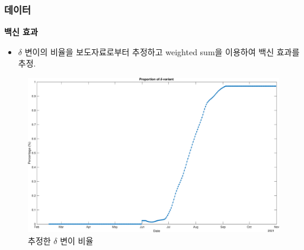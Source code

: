 \documentclass[aspectratio=169, 9pt, xcolor=dvipsnames]{beamer}
\begin{document}
		\begin{frame}\frametitle{데이터}
	    \textbf{백신 효과} \\
		\begin{itemize}
			\item $\delta$ 변이의 비율을 보도자료로부터 추정하고 weighted sum을 이용하여 백신 효과를 추정.
		\end{itemize}
	    \begin{minipage}{0.3\textwidth}
	    	\begin{table}
	    		\caption{질병관리청에서 보도된 검출된 델타 변이 비율}
	    	\end{table}
	    \end{minipage}
	    \hfill
	    \begin{minipage}{0.6\textwidth}
	    	\begin{figure}
	    		\centering
	    		\includegraphics[width=\textwidth]{../results/data/delta_proportion.eps}
	    		\caption{추정한 $\delta$ 변이 비율}
	    	\end{figure}
	    \end{minipage}
	\end{frame}
\end{document}

